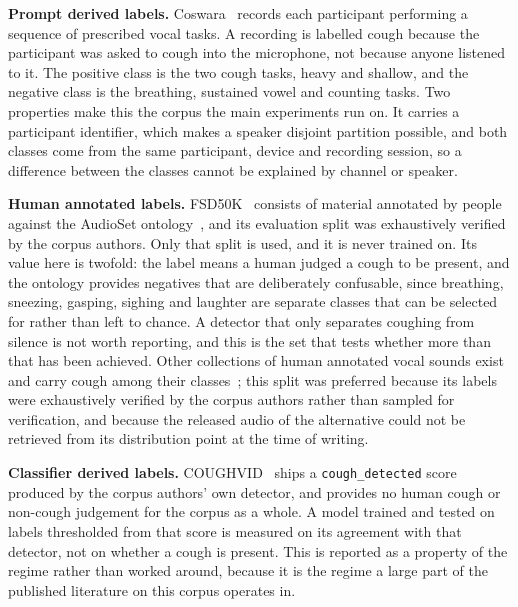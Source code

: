 \textbf{Prompt derived labels.} Coswara~\cite{coswara2020} records each participant
performing a sequence of prescribed vocal tasks. A recording is labelled cough because
the participant was asked to cough into the microphone, not because anyone listened to
it. The positive class is the two cough tasks, heavy and shallow, and the negative class
is the breathing, sustained vowel and counting tasks. Two properties make this the corpus
the main experiments run on. It carries a participant identifier, which makes a speaker
disjoint partition possible, and both classes come from the same participant, device and
recording session, so a difference between the classes cannot be explained by channel or
speaker.

\textbf{Human annotated labels.} FSD50K~\cite{fsd50k2022} consists of material annotated
by people against the AudioSet ontology~\cite{gemmeke2017}, and its evaluation split was
exhaustively verified by the corpus authors. Only that split is used, and it is never
trained on. Its value here is twofold: the label means a human judged a cough to be
present, and the ontology provides negatives that are deliberately confusable, since
breathing, sneezing, gasping, sighing and laughter are separate classes that can be
selected for rather than left to chance. A detector that only separates coughing from
silence is not worth reporting, and this is the set that tests whether more than that has
been achieved. Other collections of human annotated vocal sounds exist and carry cough
among their classes~\cite{vocalsound2022}; this split was preferred because its labels
were exhaustively verified by the corpus authors rather than sampled for verification, and
because the released audio of the alternative could not be retrieved from its distribution
point at the time of writing.

\textbf{Classifier derived labels.} COUGHVID~\cite{coughvid2021} ships a
\texttt{cough\_detected} score produced by the corpus authors' own detector, and provides
no human cough or non-cough judgement for the corpus as a whole. A model trained and
tested on labels thresholded from that score is measured on its agreement with that
detector, not on whether a cough is present. This is reported as a property of the
regime rather than worked around, because it is the regime a large part of the published
literature on this corpus operates in.

